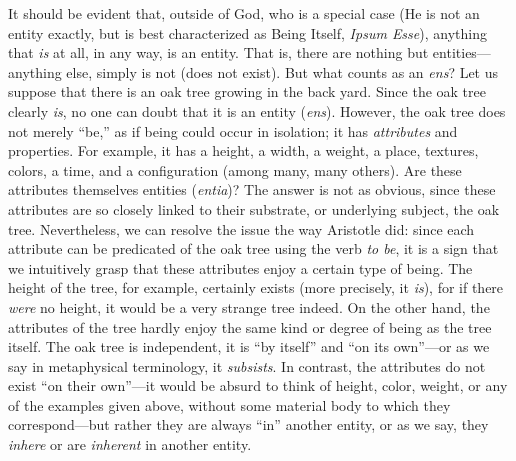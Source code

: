 \documentclass[article,12pt,a4paper,oneside]{memoir}
\begin{document}
    It should be evident that, outside of God, who is a special case (He
    is not an entity exactly, but is best characterized as Being Itself,
    \emph{Ipsum Esse}), anything that \emph{is} at all, in any way, is
    an entity. That is, there are nothing but entities---anything else,
    simply is not (does not exist). But what counts as an \emph{ens}?
    Let us suppose that there is an oak tree growing in the back yard.
    Since the oak tree clearly \emph{is}, no one can doubt that it is an
    entity (\emph{ens}). However, the oak tree does not merely ``be,''
    as if being could occur in isolation; it has \emph{attributes} and
    properties. For example, it has a height, a width, a weight, a
    place, textures, colors, a time, and a configuration (among many,
    many others). Are these attributes themselves entities
    (\emph{entia})? The answer is not as obvious, since these attributes
    are so closely linked to their substrate, or underlying subject, the
    oak tree. Nevertheless, we can resolve the issue the way Aristotle
    did: since each attribute can be predicated of the oak tree using
    the verb \emph{to be}, it is a sign that we intuitively grasp that
    these attributes enjoy a certain type of being. The height of the
    tree, for example, certainly exists (more precisely, it \emph{is}),
    for if there \emph{were} no height, it would be a very strange tree
    indeed. On the other hand, the attributes of the tree hardly enjoy
    the same kind or degree of being as the tree itself. The oak tree is
    independent, it is ``by itself'' and ``on its own''---or as we say
    in metaphysical terminology, it \emph{subsists}. In contrast, the
    attributes do not exist ``on their own''---it would be absurd to
    think of height, color, weight, or any of the examples given above,
    without some material body to which they correspond---but rather
    they are always ``in'' another entity, or as we say, they
    \emph{inhere} or are \emph{inherent} in another entity.
\end{document}
